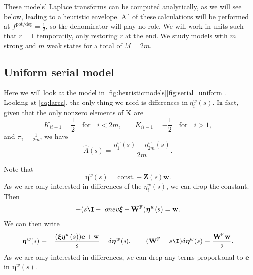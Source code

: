 \documentclass[12pt]{article}
\newcommand{\onev}{\mathbf{e}}
\newcommand{\eqm}{\pi}
\newcommand{\fundm}{Z}
\newcommand{\fund}{\mathbf{\fundm}}
\newcommand{\arowm}{\xi}
\newcommand{\arow}{\boldsymbol{\arowm}}
\newcommand{\etwm}{\eta^w}
\newcommand{\etw}{\boldsymbol{\eta}^w}
\newcommand{\wm}{w}
\newcommand{\w}{\mathbf{\wm}}
\newcommand{\Wm}{W}
\newcommand{\W}{\mathbf{\Wm}}
\newcommand{\encm}{K}
\newcommand{\enc}{\mathbf{\encm}}
\newcommand{\frg}{\W^{\mathrm{F}}}
\newcommand{\potdep}{^{\text{pot/dep}}}
\begin{document}
These models' Laplace transforms can be computed analytically, as we will see below, leading to a heuristic envelope.
All of these calculations will be performed at \(f\potdep=\frac{1}{2}\), so the denominator will play no role.
We will work in units such that \(r=1\) temporarily, only restoring \(r\) at the end.
We study models with \(m\) strong and \(m\) weak states for a total of  \(M = 2 m\).


\subsection{Uniform serial model}\label{sec:serial_uniform}

Here we will look at the model in \cref{fig:heuristicmodels}\ref{fig:serial_uniform}.
Looking at \eqref{eq:larea}, the only thing we need is differences in \(\etwm_i(s)\).
In fact, given that the only nonzero elements of \(\enc\) are
%
\begin{equation}\label{eq:unienc}
  \encm_{ii+1}=\frac{1}{2} \quad\text{for}\quad i<2m,
  \qquad
  \encm_{ii-1}=-\frac{1}{2} \quad\text{for}\quad i>1,
\end{equation}
%
and \(\eqm_i = \frac{1}{2m}\), we have
%
\begin{equation}\label{eq:uniareaeta}
  \hat{A}(s) = \frac{\etwm_1(s) - \etwm_{2m}(s)}{2m}.
\end{equation}
%

Note that
%
\begin{equation}\label{eq:etafund}
  \etw(s) = \text{const.} - \fund(s)\w.
\end{equation}
%
As we are only interested in differences of the \(\etwm_i(s)\), we can drop the constant.
Then
%
\begin{equation}\label{eq:etarecur}
  -(s\I + \ onev \arow - \frg)\etw(s) = \w.
\end{equation}
%
We can then write
%
\begin{equation}\label{eq:detarecur}
  \etw(s) = -\frac{(\arow \etw(s)) \onev + \w}{s} + \delta \etw(s),
  \qquad
  (\frg - s\I) \delta \etw(s) = \frac{\frg \w}{s}.
\end{equation}
%
As we are only interested in differences, we can drop any terms proportional to \(\onev\) in \(\etw(s)\).
\end{document}
